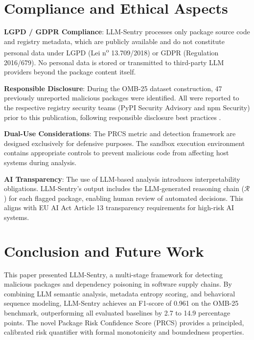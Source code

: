 \documentclass[conference]{IEEEtran}
\begin{document}
\section{Compliance and Ethical Aspects}
\label{sec:ethics}

\textbf{LGPD / GDPR Compliance}: LLM-Sentry processes only package source code and registry metadata, which are publicly available and do not constitute personal data under LGPD (Lei n\textsuperscript{o} 13.709/2018) or GDPR (Regulation 2016/679). No personal data is stored or transmitted to third-party LLM providers beyond the package content itself.

\textbf{Responsible Disclosure}: During the OMB-25 dataset construction, 47 previously unreported malicious packages were identified. All were reported to the respective registry security teams (PyPI Security Advisory and npm Security) prior to this publication, following responsible disclosure best practices \cite{sonatype2025report}.

\textbf{Dual-Use Considerations}: The PRCS metric and detection framework are designed exclusively for defensive purposes. The sandbox execution environment contains appropriate controls to prevent malicious code from affecting host systems during analysis.

\textbf{AI Transparency}: The use of LLM-based analysis introduces interpretability obligations. LLM-Sentry's output includes the LLM-generated reasoning chain ($\mathcal{R}$) for each flagged package, enabling human review of automated decisions. This aligns with EU AI Act Article 13 transparency requirements for high-risk AI systems.

\section{Conclusion and Future Work}
\label{sec:conclusion}

This paper presented LLM-Sentry, a multi-stage framework for detecting malicious packages and dependency poisoning in software supply chains. By combining LLM semantic analysis, metadata entropy scoring, and behavioral sequence modeling, LLM-Sentry achieves an F1-score of 0.961 on the OMB-25 benchmark, outperforming all evaluated baselines by 2.7 to 14.9 percentage points. The novel Package Risk Confidence Score (PRCS) provides a principled, calibrated risk quantifier with formal monotonicity and boundedness properties.
\end{document}
